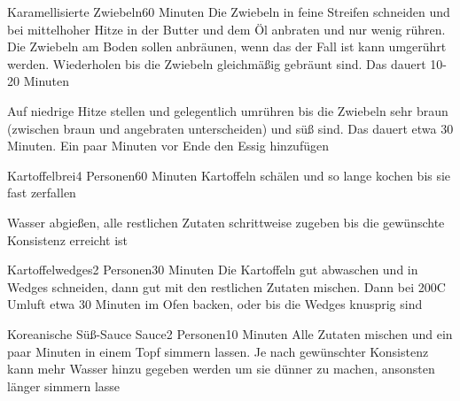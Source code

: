 
\begin{recipe}{Karamellisierte Zwiebeln}{}{60 Minuten}
Die Zwiebeln in feine Streifen schneiden und bei mittelhoher Hitze in der Butter und dem Öl anbraten und nur wenig rühren. Die Zwiebeln am Boden sollen anbräunen, wenn das der Fall ist kann umgerührt werden. Wiederholen bis die Zwiebeln gleichmäßig gebräunt sind. Das dauert 10-20 Minuten

Auf niedrige Hitze stellen und gelegentlich umrühren bis die Zwiebeln sehr braun (zwischen braun und angebraten unterscheiden) und süß sind. Das dauert etwa 30 Minuten. Ein paar Minuten vor Ende den Essig hinzufügen
\end{recipe}


\begin{recipe}{Kartoffelbrei}{4 Personen}{60 Minuten}
Kartoffeln schälen und so lange kochen bis sie fast zerfallen

Wasser abgießen, alle restlichen Zutaten schrittweise zugeben bis die gewünschte Konsistenz erreicht ist
\end{recipe}


\begin{recipe}{Kartoffelwedges}{2 Personen}{30 Minuten}
Die Kartoffeln gut abwaschen und in Wedges schneiden, dann gut mit den restlichen Zutaten mischen. Dann bei 200\0C Umluft etwa 30 Minuten im Ofen backen, oder bis die Wedges knusprig sind
\end{recipe}


\begin{recipe}{Koreanische Süß-Sauce Sauce}{2 Personen}{10 Minuten}
Alle Zutaten mischen und ein paar Minuten in einem Topf simmern lassen. Je nach gewünschter Konsistenz kann mehr Wasser hinzu gegeben werden um sie dünner zu machen, ansonsten länger simmern lasse 
\end{recipe}

